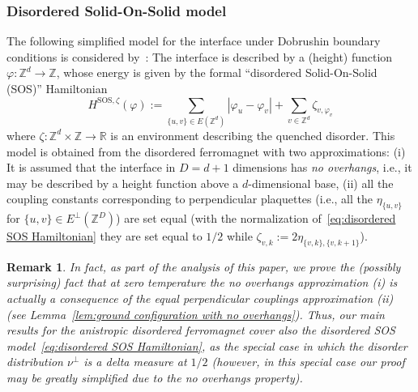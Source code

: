 \documentclass[11pt, reqno]{amsart}
\newtheorem{remark}[theorem]{Remark}
\newcommand{\Z}{\mathbb{Z}}
\newcommand{\R}{\mathbb{R}}
\numberwithin{equation}{section}
\begin{document}
\subsubsection{Disordered Solid-On-Solid model}\label{sec:disordered SOS model}
The following simplified model for the interface under Dobrushin boundary conditions is considered by~\cites{HH85, BFG86}: The interface is described by a (height) function $\varphi:\Z^d\to\Z$, whose energy is given by the formal ``disordered Solid-On-Solid (SOS)'' Hamiltonian
\begin{equation}\label{eq:disordered SOS Hamiltonian}
H^{\text{SOS}, \zeta}(\varphi):=\sum_{\{u,v\}\in E(\Z^d)} |\varphi_u - \varphi_v| + \sum_{v\in\Z^d} \zeta_{v,\varphi_v}
\end{equation}
where $\zeta:\Z^d\times\Z\to\R$ is an environment describing the quenched disorder. This model is obtained from the disordered  ferromagnet with two approximations: (i) It is assumed that the interface in $D=d+1$ dimensions has \emph{no overhangs}, i.e., it may be described by a height function above a $d$-dimensional base, (ii) all the coupling constants corresponding to perpendicular plaquettes (i.e., all the $\eta_{\{u,v\}}$ for $\{u,v\}\in E^\perp(\Z^D)$) are set equal (with the normalization of~\eqref{eq:disordered SOS Hamiltonian} they are set equal to $1/2$ while $\zeta_{v,k}:=2\eta_{\{v,k\},\{v,k+1\}}$). 
\begin{remark}\label{rem:disordered SOS model special case} In fact, as part of the analysis of this paper, we prove the (possibly surprising) fact that at zero temperature the no overhangs approximation (i) is actually a consequence of the equal perpendicular couplings approximation (ii) (see Lemma~\ref{lem:ground configuration with no overhangs}). Thus, our main results for the anistropic disordered ferromagnet cover also the disordered SOS model~\eqref{eq:disordered SOS Hamiltonian}, as the special case in which the disorder distribution $\nu^\perp$ is a delta measure at $1/2$ (however, in this special case our proof may be greatly simplified due to the no overhangs property).
\end{remark}
\end{document}

